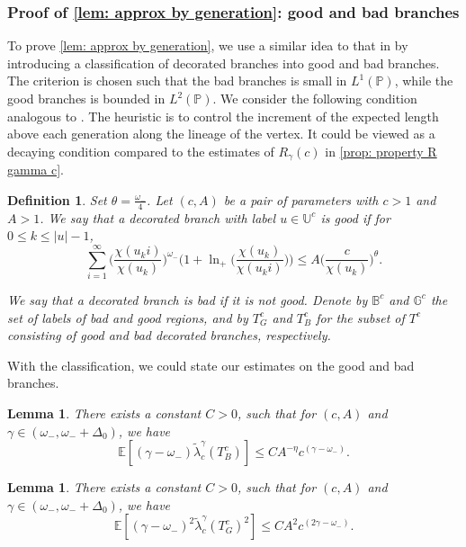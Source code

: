 \documentclass[12pt]{article}
\numberwithin{equation}{section}
\theoremstyle{plain}
\newtheorem{defn}[thm]{Definition}
\newtheorem{lem}[thm]{Lemma}
\theoremstyle{definition}
\begin{document}
\subsubsection{Proof of \cref{lem: approx by generation}: good and bad branches}
To prove \cref{lem: approx by generation}, we use a similar idea to that in \cite[Section 5]{AidekonElie2026TSLo} by introducing a classification of decorated branches into good and bad branches. The criterion is chosen such that the bad branches is small in $L^1(\mathbb{P})$, while the good branches is bounded in $L^2(\mathbb{P})$. We consider the following condition analogous to \cite[Definition 5.4]{AidekonElie2026TSLo}. The heuristic is to control the increment of the expected length above each generation along the lineage of the vertex. It could be viewed as
a decaying condition compared to the estimates of $R_{\gamma}(c)$ in \cref{prop: property R gamma c}.
\begin{defn}\label{def: good points}
Set $\theta = \frac{\omega_-}{4}$. Let $(c, A)$ be a pair of parameters with $c>1$ and $A>1$. We say that a decorated branch with label $u\in\mathbb{U}^c$ is \textit{good} if for $0\leq k\leq |u|-1$,
\begin{equation}\label{eq: def good points}
\sum^{\infty}_{i=1} \bigg(\frac{\chi(u_ki)}{\chi(u_k)}\bigg)^{\omega_-}\Big(1+\ln_+\Big(\frac{\chi(u_k)}{\chi(u_ki)}\Big)\Big)\leq A\bigg(\frac{c}{\chi(u_k)}\bigg)^{\theta}.
\end{equation}

\noindent We say that a decorated branch is \textit{bad} if it is not good. Denote by $\mathbb{B}^c$ and $\mathbb{G}^c$ the set of labels of bad and good regions, and by $T^c_{G}$ and $T^c_{B}$ for the subset of $T^c$ consisting of good and bad decorated branches, respectively.
\end{defn}

\noindent With the classification, we could state our estimates on the good and bad branches.

\begin{lem}\label{lem: estimate bad}
There exists a constant $C>0$, such that for $(c, A)$ and $\gamma\in(\omega_-, \omega_- + \Delta_0)$, we have
\begin{equation}\label{eq: estimate bad}
\mathbb{E}[(\gamma-\omega_-)\tilde{\lambda}^{\gamma}_c(T^c_B)]\leq CA^{-\eta} c^{(\gamma-\omega_-)}.
\end{equation}
\end{lem}

\begin{lem}\label{lem: estimate good}
There exists a constant $C>0$, such that for $(c, A)$ and $\gamma\in(\omega_-, \omega_- + \Delta_0)$, we have
\begin{equation}
\mathbb{E}[(\gamma-\omega_-)^2\tilde{\lambda}^{\gamma}_c(T^c_G)^2]\leq CA^2c^{(2\gamma-\omega_-)}.
\end{equation}
\end{lem}
\end{document}

